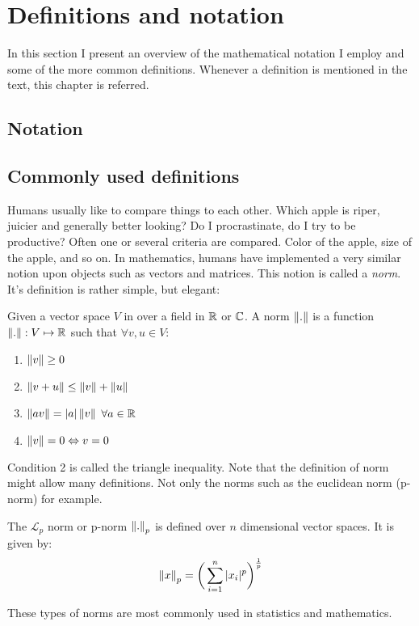 \chapter*{Definitions and notation}

In this section I present an overview of the mathematical notation I employ and some of the more common definitions. Whenever a definition is mentioned in the text, this chapter is referred.

\section*{Notation}

\section*{Commonly used definitions}

Humans usually like to compare things to each other. Which apple is riper, juicier and generally better looking? Do I procrastinate, do I try to be productive? Often one or several criteria are compared. Color of the apple, size of the apple, and so on. In mathematics, humans have implemented a very similar notion upon objects such as vectors and matrices. This notion is called a \textit{norm}. It's definition is rather simple, but elegant:

\begin{defn} 
Given a vector space $V$ in over a field in $\mathbb{R}$ or $\mathbb{C}$. A norm $\left\lVert.\right\rVert$ is a function $\left\lVert.\right\rVert:V \mapsto \mathbb{R}$ such that $\forall v, u \in V$:
\begin{enumerate}
\item $\left\lVert v\right\rVert \geq 0$
\item $\left\lVert v + u\right\rVert \leq \left\lVert v\right\rVert + \left\lVert u\right\rVert$
\item $\left\lVert av\right\rVert = |a|\left\lVert v\right\rVert$ $\forall a \in \mathbb{R}$
\item $\left\lVert v\right\rVert = 0 \Leftrightarrow v = 0$
\end{enumerate}
Condition 2 is called the triangle inequality. Note that the definition of norm might allow many definitions. Not only the norms such as the euclidean norm (p-norm) for example.
\end{defn}

\begin{defn}
The $\mathcal{L}_p$ norm or p-norm $\left\lVert.\right\rVert_p$ is defined over $n$ dimensional vector spaces. It is given by:
\begin{equation}
\left\lVert x\right\rVert_p = \bigg( \sum_{i=1}^{n} |x_i|^p \bigg)^\frac{1}{p}
\end{equation}

\end{defn}
These types of norms are most commonly used in statistics and mathematics.
\begin{defn}

\end{defn}